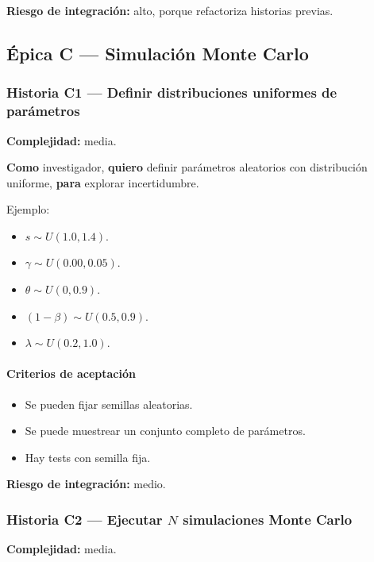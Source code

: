 \documentclass[11pt,a4paper]{article}
\begin{document}
\textbf{Riesgo de integraci\'on:} alto, porque refactoriza historias previas.

\subsection{\'Epica C --- Simulaci\'on Monte Carlo}

\subsubsection{Historia C1 --- Definir distribuciones uniformes de par\'ametros}

\textbf{Complejidad:} media.

\textbf{Como} investigador, \textbf{quiero} definir par\'ametros aleatorios con distribuci\'on uniforme, \textbf{para} explorar incertidumbre.

Ejemplo:

\begin{itemize}[leftmargin=*]
    \item $s \sim U(1.0,1.4)$.
    \item $\gamma \sim U(0.00,0.05)$.
    \item $\theta \sim U(0,0.9)$.
    \item $(1-\beta) \sim U(0.5,0.9)$.
    \item $\lambda \sim U(0.2,1.0)$.
\end{itemize}

\paragraph{Criterios de aceptaci\'on}

\begin{itemize}[leftmargin=*]
    \item Se pueden fijar semillas aleatorias.
    \item Se puede muestrear un conjunto completo de par\'ametros.
    \item Hay tests con semilla fija.
\end{itemize}

\textbf{Riesgo de integraci\'on:} medio.

\subsubsection{Historia C2 --- Ejecutar $N$ simulaciones Monte Carlo}

\textbf{Complejidad:} media.
\end{document}
